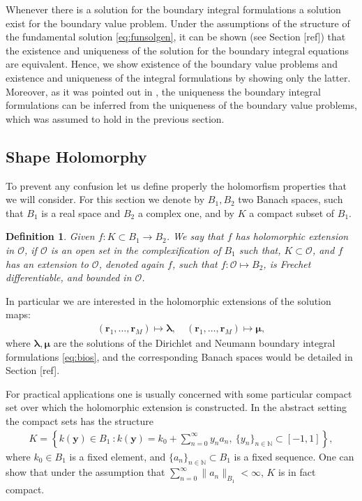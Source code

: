 \documentclass{article}
\newtheorem{definition}[theorem]{Definition}
\newcommand{\todo}[1]{{\color{red}[#1]}}
\newcommand{\cO}{\mathcal O}
\newcommand{\bmu} {\bm{\mu}}
\newcommand{\IN}{{\mathbb N}}
\newcommand{\bla}{\boldsymbol \lambda}
\newcommand{\br}{\bm{r}}
\newcommand{\by}{\bm{y}}
\begin{document}
Whenever there is a solution for the boundary integral formulations a solution exist for the boundary value problem. Under the assumptions of the 
structure of the fundamental solution \eqref{eq:funsolgen}, it can be shown (see Section \todo{ref}) that the existence and uniqueness of the solution for the boundary integral equations are equivalent. Hence, we show existence of the boundary value problems and  existence and uniqueness of the integral formulations by showing only  the latter. Moreover, as it was pointed out in \cite{JHP20}, the uniqueness the boundary integral formulations can be inferred from the uniqueness of the boundary value problems, which was assumed to hold in the previous section. 

\subsection{Shape Holomorphy}
\label{section:ShapeHolormsGeneral}

To prevent any confusion let us define properly the holomorfism properties that we will consider. For this section we denote by $B_1,B_2$ two Banach spaces, such that $B_1$ is a real space and $B_2$ a complex one, and by $K$ a compact subset of $B_1$. 

\begin{definition}
\label{def:holmrfextension}
Given $f :K \subset B_1 \rightarrow B_2$. We say that $f$ has holomorphic extension in $\cO$, if $\cO$ is an open set in the complexification of $B_1$ such that, $K \subset \cO$, and $f$ has an extension to $\cO$, denoted again $f$, such that $f : \cO \mapsto B_2$, is Frechet differentiable, and bounded in $\cO$.
\end{definition}

In particular we are interested in the holomorphic extensions of the solution maps: 
\begin{align*}
(\br_1,\hdots,\br_M) \mapsto \bla, \quad (\br_1,\hdots,\br_M) \mapsto \bmu,
\end{align*}
where $\bla,\bmu$ are the solutions of the Dirichlet and Neumann boundary integral formulations \eqref{eq:bios}, and the corresponding Banach spaces would be detailed in Section \todo{ref}.

For practical applications one is usually concerned with some particular compact set over which the holomorphic extension is constructed. In the abstract setting the compact sets has the structure 
\begin{align}
\label{eq:Kcompact}
K =\left\lbrace k(\by) \in B_1 \ : k(\by) = k_0 + \sum_{n=0}^\infty y_n a_n, \ \{y_n\}_{n \in \IN} \subset [-1,1] \right\rbrace,
\end{align}
where $k_0 \in B_1$ is a fixed element, and $\{a_n\}_{n\in \IN} \subset B_1$ is  a fixed sequence. One can show that under the assumption that $\sum_{n=0}^\infty \|a_n\|_{B_1} < \infty$, $K$ is in fact compact. 
\end{document}
